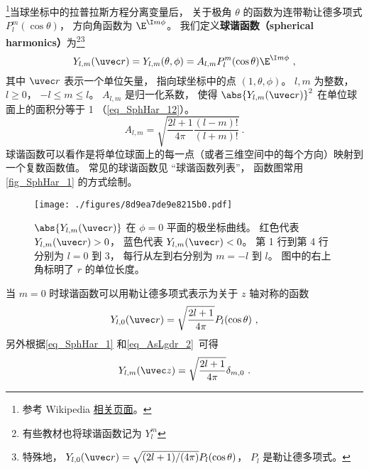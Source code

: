 

\footnote{参考 Wikipedia \href{https://en.wikipedia.org/wiki/Spherical_harmonics}{相关页面}。}当球坐标中的拉普拉斯方程分离变量后， 关于极角 $\theta$ 的函数为连带勒让德多项式 $P_l^m(\cos\theta)$， 方向角函数为 $\E^{\I m\phi}$。 我们定义\textbf{球谐函数（spherical harmonics）}为\footnote{有些教材也将球谐函数记为 $Y_l^m$}\footnote{特殊地， $Y_{l,0}(\uvec r) = \sqrt{(2l + 1)/(4\pi)}P_l(\cos\theta)$， $P_l$ 是勒让德多项式。}
\begin{equation}\label{eq_SphHar_1}
Y_{l, m} (\uvec r) = Y_{l, m}(\theta, \phi) = A_{l,m} P_l^m(\cos \theta) \E^{\I m\phi}~,
\end{equation}
其中 $\uvec r$ 表示一个单位矢量， 指向球坐标中的点 $(1, \theta, \phi)$。 $l, m$ 为整数， $l \geqslant 0$， $-l \leqslant m \leqslant l$。 $A_{l,m}$ 是归一化系数， 使得 $\abs{Y_{l, m} (\uvec r)}^2$ 在单位球面上的面积分等于 1 （\autoref{eq_SphHar_12}）。
\begin{equation}\label{eq_SphHar_2}
A_{l,m} =  \sqrt{\frac{2l + 1}{4\pi }\frac{(l - m)!}{(l + m)!}}~.
\end{equation}
球谐函数可以看作是将单位球面上的每一点（或者三维空间中的每个方向）映射到一个复数函数值。 常见的球谐函数见 “球谐函数列表”， 函数图常用\autoref{fig_SphHar_1} 的方式绘制。

\begin{figure}[ht]
\centering
\texttt{[image: ./figures/8d9ea7de9e8215b0.pdf]}
\caption{$\abs{Y_{l,m}(\uvec r)}$ 在 $\phi=0$ 平面的极坐标曲线。 红色代表 $Y_{l,m}(\uvec r) > 0$， 蓝色代表 $Y_{l,m}(\uvec r) < 0$。 第 1 行到第 4 行分别为 $l = 0$ 到 $3$， 每行从左到右分别为 $m = -l$ 到 $l$。 图中的右上角标明了 $r$ 的单位长度。} \label{fig_SphHar_1}
\end{figure}

当 $m = 0$ 时球谐函数可以用勒让德多项式表示为关于 $z$ 轴对称的函数
\begin{equation}\label{eq_SphHar_11}
Y_{l,0}(\uvec r) = \sqrt{\frac{2l+1}{4\pi}} P_l(\cos\theta)~,
\end{equation}
另外根据\autoref{eq_SphHar_1} 和\autoref{eq_AsLgdr_2}~可得
\begin{equation}
Y_{l,m}(\uvec z) = \sqrt{\frac{2l+1}{4\pi}} \delta_{m,0}~.
\end{equation}

